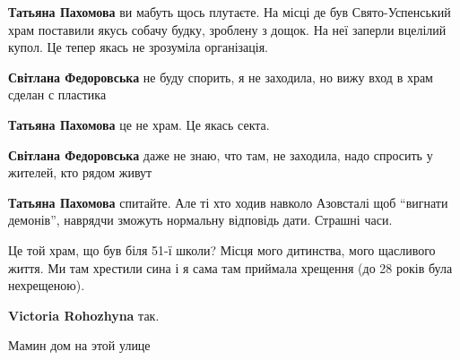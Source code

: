 \begin{itemize} %
\textbf{Татьяна Пахомова} ви мабуть щось плутаєте. На місці де був Свято-Успенський храм поставили якусь собачу будку, зроблену з дощок. На неї заперли вцелілий купол. Це тепер якась не зрозуміла організація.

\begin{itemize} %
\textbf{Світлана Федоровська} не буду спорить, я не заходила, но вижу вход в храм сделан с пластика

\textbf{Татьяна Пахомова} це не храм. Це якась секта.

\textbf{Світлана Федоровська} даже не знаю, что там, не заходила, надо спросить у жителей, кто рядом живут

\textbf{Татьяна Пахомова} спитайте. Але ті хто ходив навколо Азовсталі щоб \enquote{вигнати демонів}, наврядчи зможуть нормальну відповідь дати. Страшні часи.
\end{itemize} %

\end{itemize} %


Це той храм, що був біля 51-ї школи? Місця мого дитинства, мого щасливого
життя. Ми там хрестили сина і я сама там приймала хрещення (до 28 років була
нехрещеною).

\textbf{Victoria Rohozhyna} так.


Мамин дом на этой улице
